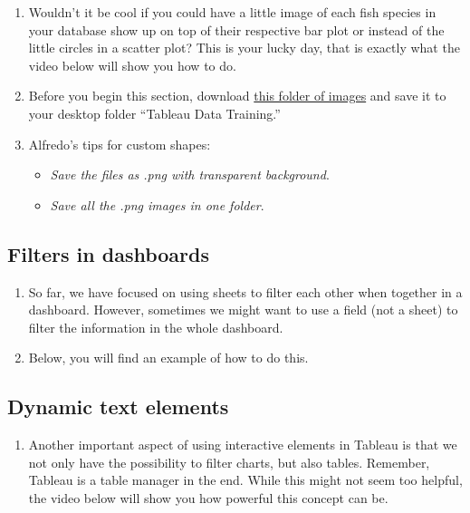 \documentclass[
]{book}
\providecommand{\tightlist}{%
  \setlength{\itemsep}{0pt}\setlength{\parskip}{0pt}}
\begin{document}
\begin{enumerate}
\def\labelenumi{\arabic{enumi}.}
\item
  Wouldn't it be cool if you could have a little image of each fish species in your database show up on top of their respective bar plot or instead of the little circles in a scatter plot? This is your lucky day, that is exactly what the video below will show you how to do.
\item
  Before you begin this section, download \href{https://github.com/NCEAS/data-training-picrc-cos/raw/main/images/TNC\%20-\%20Fish\%20Images.zip}{this folder of images} and save it to your desktop folder ``Tableau Data Training.''
\item
  Alfredo's tips for custom shapes:

  \begin{itemize}
  \tightlist
  \item
    \emph{Save the files as .png with transparent background}.
  \item
    \emph{Save all the .png images in one folder}.
  \end{itemize}
\end{enumerate}

\hypertarget{filters-in-dashboards}{%
\subsection{Filters in dashboards}\label{filters-in-dashboards}}

\begin{enumerate}
\def\labelenumi{\arabic{enumi}.}
\item
  So far, we have focused on using sheets to filter each other when together in a dashboard. However, sometimes we might want to use a field (not a sheet) to filter the information in the whole dashboard.
\item
  Below, you will find an example of how to do this.
\end{enumerate}

\hypertarget{dynamic-text-elements}{%
\subsection{Dynamic text elements}\label{dynamic-text-elements}}

\begin{enumerate}
\def\labelenumi{\arabic{enumi}.}
\tightlist
\item
  Another important aspect of using interactive elements in Tableau is that we not only have the possibility to filter charts, but also tables. Remember, Tableau is a table manager in the end. While this might not seem too helpful, the video below will show you how powerful this concept can be.
\end{enumerate}
\end{document}
